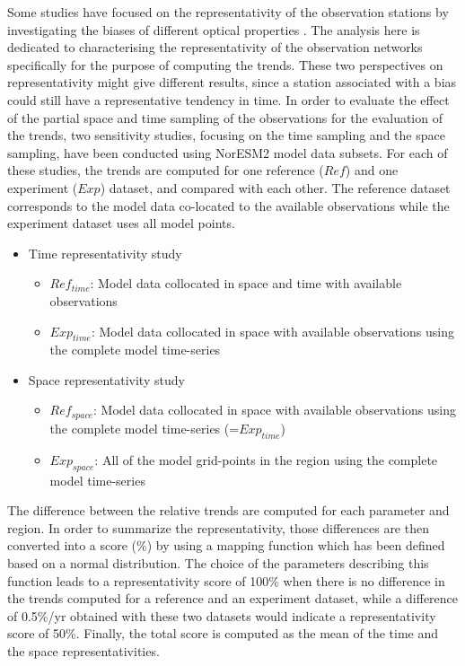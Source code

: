 \documentclass[acp, manuscript]{copernicus}
\begin{document}
Some studies have focused on the representativity of the observation stations by investigating the biases of different optical properties \citep{wang2017,schutgens2017spatio,schutgens2019site}. The analysis here is dedicated to characterising the  representativity of the observation networks specifically for the purpose of computing the trends. These two perspectives on representativity might give different results, since a station associated with a bias could still have a representative tendency in time. In order to evaluate the effect of the partial space and time sampling of the observations for the evaluation of the trends, two sensitivity studies, focusing on the time sampling and the space sampling, have been conducted using NorESM2 model data subsets. For each of these studies, the trends are computed for one reference ($Ref$) and one experiment ($Exp$) dataset, and compared with each other. The reference dataset corresponds to the model data co-located to the available observations while the experiment dataset uses all model points.
\begin{itemize}
 \item Time representativity study
       \begin{itemize}
        \item $Ref_{time}$: Model data collocated in space and time with available observations
        \item $Exp_{time}$: Model data collocated in space with available observations using the complete model time-series
       \end{itemize}
 \item Space representativity study
       \begin{itemize}
        \item $Ref_{space}$: Model data collocated in space with available observations using the complete model time-series (=$Exp_{time}$)
        \item $Exp_{space}$: All of the model grid-points in the region using the complete model time-series
       \end{itemize}
\end{itemize}

The difference between the relative trends are computed for each parameter and region. In order to summarize the representativity, those differences are then converted into a score (\unit{\%}) by using a mapping function which has been defined based on a normal distribution. The choice of the parameters describing this function leads to a representativity score of 100\% when there is no difference in the trends computed for a reference and an experiment dataset, while a difference of 0.5\unit{\%/yr} obtained with these two datasets would indicate a representativity score of 50\%.  Finally, the total score is computed as the mean of the time and the space representativities. 
\end{document}
